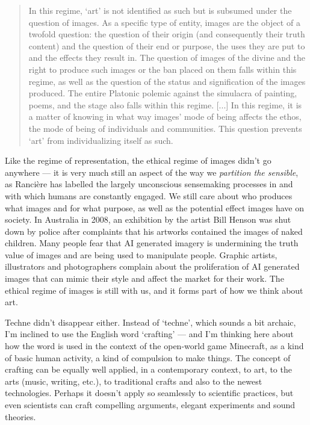 \documentclass[letterpaper]{article}
\begin{document}
    \begin{quote}
        In this regime, ‘art’ is not identified as such but is subsumed under the question of images. As a specific type of entity, images are the object of a twofold question: the question of their origin (and consequently their truth content) and the question of their end or purpose, the uses they are put to and the effects they result in. The question of images of the divine and the right to produce such images or the ban placed on them falls within this regime, as well as the question of the status and signification of the images produced. The entire Platonic polemic against the simulacra of painting, poems, and the stage also falls within this regime. [...] In this regime, it is a matter of knowing in what way images' mode of being affects the ethos, the mode of being of individuals and communities. This question prevents ‘art’ from individualizing itself as such. \citep[pp.20-21]{RancierPltcsOfThAsthtcs2004}
    \end{quote}

    Like the regime of representation, the ethical regime of images didn't go anywhere — it is very much still an aspect of the way we \emph{partition the sensible}, as Rancière has labelled the largely unconscious sensemaking processes in and with which humans are constantly engaged. We still care about who produces what images and for what purpose, as well as the potential effect images have on society. In Australia in 2008, an exhibition by the artist Bill Henson was shut down by police after complaints that his artworks contained the images of naked children. Many people fear that AI generated imagery is undermining the truth value of images and are being used to manipulate people. Graphic artists, illustrators and photographers complain about the proliferation of AI generated images that can mimic their style and affect the market for their work. The ethical regime of images is still with us, and it forms part of how we think about art. 

    Techne didn't disappear either. Instead of ‘techne’, which sounds a bit archaic, I'm inclined to use the English word ‘crafting’ — and I'm thinking here about how the word is used in the context of the open-world game Minecraft, as a kind of basic human activity, a kind of compulsion to make things. The concept of crafting can be equally well applied, in a contemporary context, to art, to the arts (music, writing, etc.), to traditional crafts and also to the newest technologies. Perhaps it doesn't apply so seamlessly to scientific practices, but even scientists can craft compelling arguments, elegant experiments and sound theories.
\end{document}
